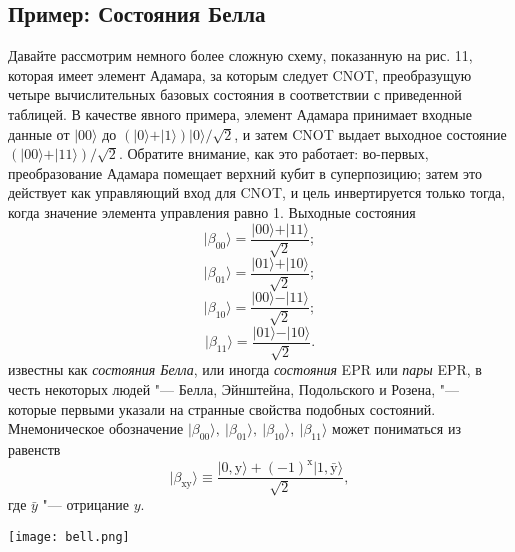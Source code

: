 \begin{multicols}{2}
    \section*{Пример: Состояния Белла} 
    \normalsize{
        Давайте рассмотрим немного более сложную схему, показанную на рис. 11, которая имеет
        элемент Адамара, за которым следует CNOT, преобразущую четыре вычислительных базовых состояния
        в соответствии с приведенной таблицей. В качестве явного примера, элемент Адамара принимает входные данные от $\vert00\rangle$ до $(\vert0\rangle+\vert1\rangle)\vert0\rangle/\sqrt2$, и затем CNOT выдает выходное состояние $(\vert00\rangle+\vert11\rangle)/\sqrt2$.
        Обратите внимание, как это работает: во-первых, преобразование Адамара помещает верхний кубит в суперпозицию;
        затем это действует как управляющий вход для CNOT, и цель инвертируется только тогда, когда
        значение элемента управления равно 1. Выходные состояния
        \begin{equation}
            \vert\beta_{00}\rangle=\frac{\vert00\rangle+\vert11\rangle}{\sqrt2};
        \end{equation}
        \begin{equation}
            \vert\beta_{01}\rangle=\frac{\vert01\rangle+\vert10\rangle}{\sqrt2};
        \end{equation}
        \begin{equation}
            \vert\beta_{10}\rangle=\frac{\vert00\rangle-\vert11\rangle}{\sqrt2};
        \end{equation}
        \begin{equation}
            \vert\beta_{11}\rangle=\frac{\vert01\rangle-\vert10\rangle}{\sqrt2}.
        \end{equation}
        известны как \emph{состояния Белла}, или иногда \emph{состояния} EPR или \emph{пары} EPR, в честь некоторых
        людей "--- Белла, Эйнштейна, Подольского и Розена, "--- которые первыми указали на странные
        свойства подобных состояний. Мнемоническое обозначение $\vert\beta_{00}\rangle,~\vert\beta_{01}\rangle,~\vert\beta_{10}\rangle,~\vert\beta_{11}\rangle$ может пониматься из равенств
        \begin{equation}
            \vert\beta_{\text{xy}}\rangle\equiv\frac{\vert0,\text{y}\rangle+(-1)^{\text{x}}\vert1,\bar{\text{y}}\rangle}{\sqrt2},
        \end{equation}
        где $\bar{y}$ "--- отрицание $y$.
    }\\
    \begin{flushleft}
        \begin{minipage}{0.3\textwidth}{\texttt{[image: bell.png]}}
        \end{minipage}\\
        \vspace{0.3cm}
    \end{flushleft}

\end{multicols}
